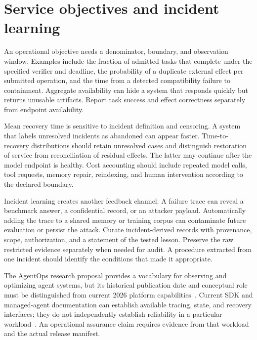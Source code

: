 \section{Service objectives and incident learning}\label{sec:C32:06}
An operational objective needs a denominator, boundary, and observation window. Examples include the fraction of admitted tasks that complete under the specified verifier and deadline, the probability of a duplicate external effect per submitted operation, and the time from a detected compatibility failure to containment. Aggregate availability can hide a system that responds quickly but returns unusable artifacts. Report task success and effect correctness separately from endpoint availability.

Mean recovery time is sensitive to incident definition and censoring. A system that labels unresolved incidents as abandoned can appear faster. Time-to-recovery distributions should retain unresolved cases and distinguish restoration of service from reconciliation of residual effects. The latter may continue after the model endpoint is healthy. Cost accounting should include repeated model calls, tool requests, memory repair, reindexing, and human intervention according to the declared boundary.

Incident learning creates another feedback channel. A failure trace can reveal a benchmark answer, a confidential record, or an attacker payload. Automatically adding the trace to a shared memory or training corpus can contaminate future evaluation or persist the attack. Curate incident-derived records with provenance, scope, authorization, and a statement of the tested lesson. Preserve the raw restricted evidence separately when needed for audit. A procedure extracted from one incident should identify the conditions that made it appropriate.

The AgentOps research proposal provides a vocabulary for observing and optimizing agent systems, but its historical publication date and conceptual role must be distinguished from current 2026 platform capabilities~\cite{corpus250711277}. Current SDK and managed-agent documentation can establish available tracing, state, and recovery interfaces; they do not independently establish reliability in a particular workload~\cite{openai2026agents}. An operational assurance claim requires evidence from that workload and the actual release manifest.

